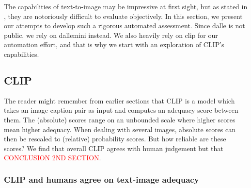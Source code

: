 \documentclass{article}
\begin{document}
\begin{multicols}{2}

The capabilities of text-to-image may be impressive at first sight, but as stated in \cite{probml-advanced}, they are notoriously difficult to evaluate objectively. In this section, we present our attempts to develop such a rigorous automated assessment. Since \gls{dalle} is not public, we rely on \gls{dallemini} instead. We also heavily rely on \gls{clip} for our automation effort, and that is why we start with an exploration of CLIP's capabilities.



\subsection{CLIP}

The reader might remember from earlier sections that CLIP is a model which takes an image-caption pair as input and computes an adequacy score between them. The (absolute) scores range on an unbounded scale where higher scores mean higher adequacy. When dealing with several images, absolute scores can then be rescaled to (relative) probability scores. But how reliable are these scores? We find that overall CLIP agrees with human judgement but that \textcolor{red}{CONCLUSION 2ND SECTION}.

\subsubsection{CLIP and humans agree on text-image adequacy}


\end{multicols}
\end{document}
